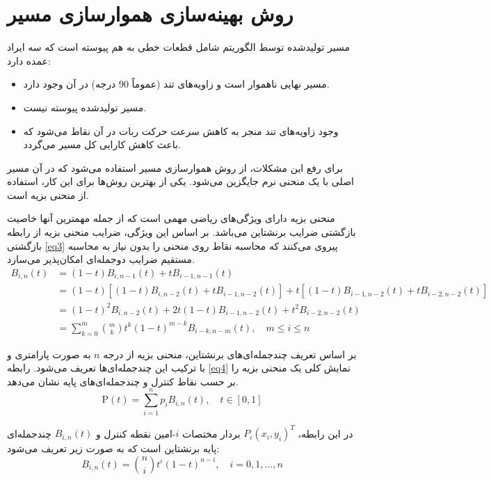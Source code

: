 \section{روش بهینه‌سازی هموارسازی مسیر}\label{33}

مسیر تولیدشده توسط الگوریتم  شامل قطعات خطی به هم پیوسته است که سه ایراد عمده دارد:

\begin{itemize}
	\item مسیر نهایی ناهموار است و زاویه‌های تند (عموماً 90 درجه) در آن وجود دارد.
	\item مسیر تولیدشده پیوسته نیست.
	\item وجود زاویه‌های تند منجر به کاهش سرعت حرکت ربات در آن نقاط می‌شود که باعث کاهش کارایی کل مسیر می‌گردد.
\end{itemize}

برای رفع این مشکلات، از روش هموارسازی مسیر استفاده می‌شود که در آن مسیر اصلی با یک منحنی نرم جایگزین می‌شود. یکی از بهترین روش‌ها برای این کار، استفاده از منحنی بزیه است.

منحنی بزیه دارای ویژگی‌های ریاضی مهمی است که از جمله مهمترین آنها خاصیت بازگشتی ضرایب برنشتاین می‌باشد. بر اساس این ویژگی، ضرایب منحنی بزیه از رابطه بازگشتی \eqref{eq3} پیروی می‌کنند که محاسبه نقاط روی منحنی را بدون نیاز به محاسبه مستقیم ضرایب دوجمله‌ای امکان‌پذیر می‌سازد.
\begin{align}
	B_{i,n}(t) &= (1 - t)B_{i,n-1}(t) + tB_{i-1,n-1}(t) \nonumber \\
	&= (1 - t)\left[(1 - t)B_{i,n-2}(t) + tB_{i-1,n-2}(t)\right] + t\left[(1 - t)B_{i-1,n-2}(t) + tB_{i-2,n-2}(t)\right] \nonumber \\
	&= (1 - t)^2 B_{i,n-2}(t) + 2t(1 - t)B_{i-1,n-2}(t) + t^2 B_{i-2,n-2}(t) \nonumber \\
	&= \sum_{k=0}^{m} \binom{m}{k} t^k (1 - t)^{m-k} B_{i-k, n-m}(t), \quad m \le i \le n
	\label{eq3}
\end{align}

بر اساس تعریف چندجمله‌ای‌های برنشتاین، منحنی بزیه از درجه \( n \) به صورت پارامتری و با ترکیب این چندجمله‌ای‌ها تعریف می‌شود. رابطه \eqref{eq4} نمایش کلی یک منحنی بزیه را بر حسب نقاط کنترل و چندجمله‌ای‌های پایه نشان می‌دهد.
\begin{equation}
	\mathrm{P}(t) = \sum_{i=1}^{n} p_i B_{i,n}(t), \quad t \in [0, 1]
	\label{eq4}
\end{equation}

در این رابطه، \( P_i(x_i, y_i)^T \) بردار مختصات \( i \)-امین نقطه کنترل و \( B_{i,n}(t) \) چندجمله‌ای پایه برنشتاین است که به صورت زیر تعریف می‌شود:
\begin{equation}
	B_{i,n}(t) = \binom{n}{i} t^i (1 - t)^{n-i}, \quad i = 0, 1, \dots, n
	\label{eq:bernstein}
\end{equation}

